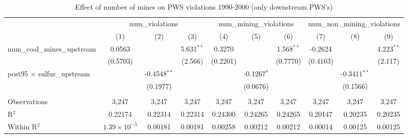 
\begin{table}[htbp]
   \caption{\label{olsrf2sls_nummine_count_vio_1990to2000dwnstrm} Effect of number of mines on PWS violations 1990-2000 (only downstream PWS's)}
   \bigskip
   \centering
   \begin{adjustbox}{width = \textwidth, center}
      \begin{tabular}{lccccccccc}
         \toprule
          & \multicolumn{3}{c}{num\_violations} & \multicolumn{3}{c}{num\_mining\_violations} & \multicolumn{3}{c}{num\_non\_mining\_violations}\\
                                                           & (1)                   & (2)            & (3)           & (4)           & (5)           & (6)           & (7)           & (8)            & (9)\\  
         \midrule 
         num\_coal\_mines\_upstream                        & 0.0563                &                & 5.631$^{**}$  & 0.3270        &               & 1.568$^{**}$  & -0.2624       &                & 4.223$^{**}$\\   
                                                           & (0.5703)              &                & (2.566)       & (0.2201)      &               & (0.7770)      & (0.4103)      &                & (2.117)\\   
         post95 $\times$ sulfur\_upstream                  &                       & -0.4548$^{**}$ &               &               & -0.1267$^{*}$ &               &               & -0.3411$^{**}$ &   \\   
                                                           &                       & (0.1977)       &               &               & (0.0676)      &               &               & (0.1566)       &   \\   
          \\
         Observations                                      & 3,247                 & 3,247          & 3,247         & 3,247         & 3,247         & 3,247         & 3,247         & 3,247          & 3,247\\  
         R$^2$                                             & 0.22174               & 0.22314        & 0.22314       & 0.24300       & 0.24265       & 0.24265       & 0.20147       & 0.20235        & 0.20235\\  
         Within R$^2$                                      & $1.39\times 10^{-5}$  & 0.00181        & 0.00181       & 0.00258       & 0.00212       & 0.00212       & 0.00014       & 0.00125        & 0.00125\\  

\end{tabular}
\end{adjustbox}
\end{table}
